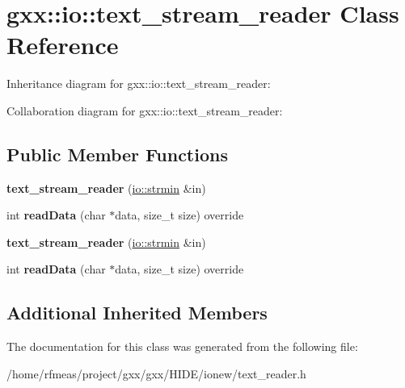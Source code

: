 \hypertarget{classgxx_1_1io_1_1text__stream__reader}{}\section{gxx\+:\+:io\+:\+:text\+\_\+stream\+\_\+reader Class Reference}
\label{classgxx_1_1io_1_1text__stream__reader}


Inheritance diagram for gxx\+:\+:io\+:\+:text\+\_\+stream\+\_\+reader\+:


Collaboration diagram for gxx\+:\+:io\+:\+:text\+\_\+stream\+\_\+reader\+:
\subsection*{Public Member Functions}
\begin{DoxyCompactItemize}
\item 
{\bfseries text\+\_\+stream\+\_\+reader} (\hyperlink{classgxx_1_1io_1_1strmin}{io\+::strmin} \&in)\hypertarget{classgxx_1_1io_1_1text__stream__reader_a4f2e101e53ca198626c917d24777dcd3}{}\label{classgxx_1_1io_1_1text__stream__reader_a4f2e101e53ca198626c917d24777dcd3}

\item 
int {\bfseries read\+Data} (char $\ast$data, size\+\_\+t size) override\hypertarget{classgxx_1_1io_1_1text__stream__reader_a3bdcb570d4175e4d035e3f080b252b9a}{}\label{classgxx_1_1io_1_1text__stream__reader_a3bdcb570d4175e4d035e3f080b252b9a}

\item 
{\bfseries text\+\_\+stream\+\_\+reader} (\hyperlink{classgxx_1_1io_1_1strmin}{io\+::strmin} \&in)\hypertarget{classgxx_1_1io_1_1text__stream__reader_a4f2e101e53ca198626c917d24777dcd3}{}\label{classgxx_1_1io_1_1text__stream__reader_a4f2e101e53ca198626c917d24777dcd3}

\item 
int {\bfseries read\+Data} (char $\ast$data, size\+\_\+t size) override\hypertarget{classgxx_1_1io_1_1text__stream__reader_a3bdcb570d4175e4d035e3f080b252b9a}{}\label{classgxx_1_1io_1_1text__stream__reader_a3bdcb570d4175e4d035e3f080b252b9a}

\end{DoxyCompactItemize}
\subsection*{Additional Inherited Members}


The documentation for this class was generated from the following file\+:\begin{DoxyCompactItemize}
\item 
/home/rfmeas/project/gxx/gxx/\+H\+I\+D\+E/ionew/text\+\_\+reader.\+h\end{DoxyCompactItemize}
